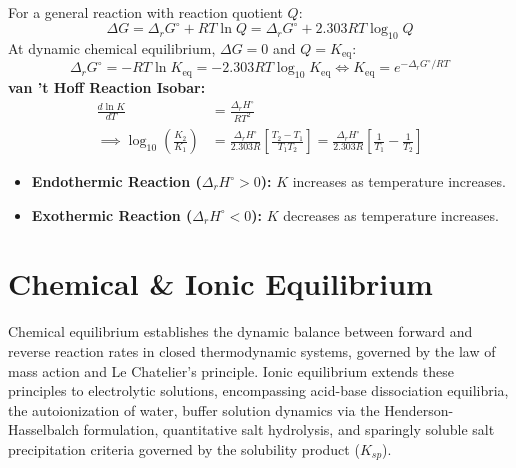 \documentclass[10pt,twoside,openright]{book}
\begin{document}
\begin{formulabox}
For a general reaction with reaction quotient $Q$:
\begin{equation}
  \Delta G = \Delta_r G^\circ + R T \ln Q = \Delta_r G^\circ + 2.303 R T \log_{10} Q
\end{equation}
At dynamic chemical equilibrium, $\Delta G = 0$ and $Q = K_{\text{eq}}$:
\begin{equation}
  \Delta_r G^\circ = -R T \ln K_{\text{eq}} = -2.303 R T \log_{10} K_{\text{eq}} \iff K_{\text{eq}} = e^{-\Delta_r G^\circ / R T}
\end{equation}
\textbf{van 't Hoff Reaction Isobar:}
\begin{align}
  \frac{d \ln K}{d T} &= \frac{\Delta_r H^\circ}{R T^2} \\
  \implies \log_{10}\left(\frac{K_2}{K_1}\right) &= \frac{\Delta_r H^\circ}{2.303 R}\left[\frac{T_2 - T_1}{T_1 T_2}\right] = \frac{\Delta_r H^\circ}{2.303 R}\left[\frac{1}{T_1} - \frac{1}{T_2}\right]
\end{align}
\begin{itemize}
  \item \textbf{Endothermic Reaction ($\Delta_r H^\circ > 0$):} $K$ increases as temperature increases.
  \item \textbf{Exothermic Reaction ($\Delta_r H^\circ < 0$):} $K$ decreases as temperature increases.
\end{itemize}
\end{formulabox}


\chapter{Chemical \& Ionic Equilibrium}

Chemical equilibrium establishes the dynamic balance between forward and reverse reaction rates in closed thermodynamic systems, governed by the law of mass action and Le Chatelier's principle. Ionic equilibrium extends these principles to electrolytic solutions, encompassing acid-base dissociation equilibria, the autoionization of water, buffer solution dynamics via the Henderson-Hasselbalch formulation, quantitative salt hydrolysis, and sparingly soluble salt precipitation criteria governed by the solubility product ($K_{sp}$).
\end{document}
